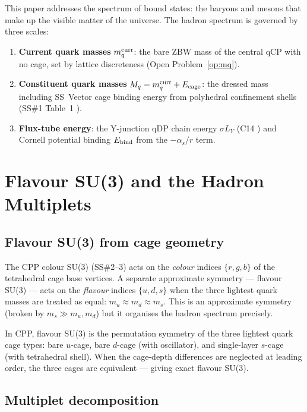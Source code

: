 \documentclass[11pt,a4paper]{article}
\newcommand{\as}{\alpha_s}
\begin{document}
This paper addresses the spectrum of bound states: the baryons and
mesons that make up the visible matter of the universe.  The hadron
spectrum is governed by three scales:

\begin{enumerate}
\item \textbf{Current quark masses} $m_q^{\rm curr}$: the bare ZBW
  mass of the central qCP with no cage, set by lattice discreteness
  (Open Problem~\ref{op:mq}).
\item \textbf{Constituent quark masses} $M_q = m_q^{\rm curr} +
  E_{\rm cage}$: the dressed mass including SS~Vector cage binding
  energy from polyhedral confinement shells (SS\#1 Table~1
  \citep{cpp_ss1}).
\item \textbf{Flux-tube energy}: the Y-junction qDP chain energy
  $\sigma L_Y$ (C14 \citep{c14}) and Cornell potential binding
  $E_{\rm bind}$ from the $-\as/r$ term.
\end{enumerate}

\section{Flavour SU(3) and the Hadron Multiplets}
\label{sec:su3flavor}

\subsection{Flavour SU(3) from cage geometry}

The CPP colour SU(3) (SS\#2--3) acts on the \emph{colour} indices
$\{r,g,b\}$ of the tetrahedral cage base vertices.  A separate
approximate symmetry --- flavour SU(3) --- acts on the
\emph{flavour} indices $\{u, d, s\}$ when the three lightest quark
masses are treated as equal: $m_u \approx m_d \approx m_s$.  This
is an approximate symmetry (broken by $m_s \gg m_u, m_d$) but it
organises the hadron spectrum precisely.

In CPP, flavour SU(3) is the permutation symmetry of the three
lightest quark cage types: bare $u$-cage, bare $d$-cage (with
oscillator), and single-layer $s$-cage (with tetrahedral shell).
When the cage-depth differences are neglected at leading order, the
three cages are equivalent --- giving exact flavour SU(3).

\subsection{Multiplet decomposition}
\end{document}
